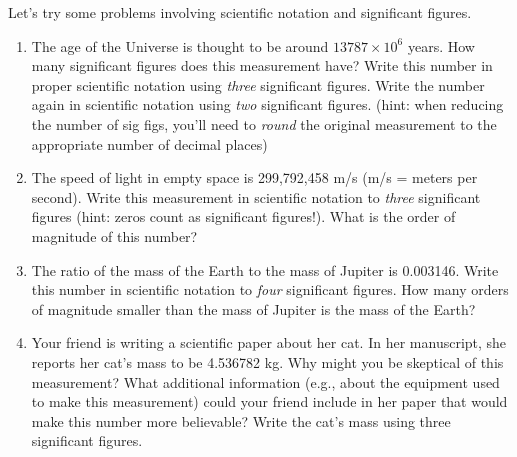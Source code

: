 \documentclass[11pt]{article}
\begin{document}
\bigskip

Let's try some problems involving scientific notation and significant figures.
\begin{enumerate}
    \item The age of the Universe is thought to be around $13787 \times 10^{6}$ years. How many significant figures does this measurement have? Write this number in proper scientific notation using \emph{three} significant figures. Write the number again in scientific notation using \emph{two} significant figures. (hint: when reducing the number of sig figs, you'll need to \emph{round} the original measurement to the appropriate number of decimal places) 
    
    \item The speed of light in empty space is 299,792,458 m/s (m/s = meters per second). Write this measurement in scientific notation to \emph{three} significant figures (hint: zeros count as significant figures!). What is the order of magnitude of this number?
    
    \item The ratio of the mass of the Earth to the mass of Jupiter is 0.003146. Write this number in scientific notation to \emph{four} significant figures. How many orders of magnitude smaller than the mass of Jupiter is the mass of the Earth?
    
    \item Your friend is writing a scientific paper about her cat. In her manuscript, she reports her cat's mass to be 4.536782 kg. Why might you be skeptical of this measurement? What additional information (e.g., about the equipment used to make this measurement) could your friend include in her paper that would make this number more believable? Write the cat's mass using three significant figures.
\end{enumerate}

\bigskip
\end{document}
